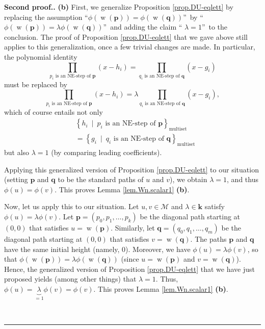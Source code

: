 \documentclass[numbers=enddot,12pt,final,onecolumn,notitlepage]{scrartcl}%
\theoremstyle{definition}
\newenvironment{proof}[1][Proof]{\noindent\textbf{#1.} }{\ \rule{0.5em}{0.5em}}
\newcommand{\M}{\mathcal{M}}
\newcommand{\kk}{\mathbf{k}}
\newcommand{\pp}{\mathbf{p}}
\newcommand{\qq}{\mathbf{q}}
\newcommand{\w}{\operatorname{w}}
\newcommand{\multiset}{\operatorname{multiset}}
\newcommand{\tup}[1]{\left( #1 \right)}
\newenvironment{verlong}{}{}
\newenvironment{vershort}{}{}
\begin{document}
\begin{proof}[Second proof.]
\textbf{(b)} First, we generalize Proposition
\ref{prop.DU-eqlett} by replacing the assumption \textquotedblleft$\phi\left(
\w\left(  \pp\right)  \right)  =\phi\left(
\w\left(  \qq\right)  \right)  $\textquotedblright\ by
\textquotedblleft$\phi\left(  \w\left(  \pp\right)
\right)  =\lambda\phi\left(  \w\left(  \qq\right)
\right)  $\textquotedblright\ and adding the claim \textquotedblleft%
$\lambda=1$\textquotedblright\ to the conclusion. The proof of Proposition
\ref{prop.DU-eqlett} that we gave above still applies to this generalization,
once a few trivial changes are made. In particular, the polynomial identity%
\[
\prod_{p_{i}\text{ is an NE-step of }\pp}\left(  x-h_{i}\right)
=\prod_{q_{i}\text{ is an NE-step of }\qq}\left(  x-g_{i}\right)
\]
must be replaced by%
\[
\prod_{p_{i}\text{ is an NE-step of }\pp}\left(  x-h_{i}\right)
=\lambda\prod_{q_{i}\text{ is an NE-step of }\qq}\left(  x-g_{i}%
\right)  ,
\]
which of course entails not only%
\begin{align*}
&  \left\{  h_{i}\ \mid\ p_{i}\text{ is an NE-step of }\pp\right\}
_{\multiset}\\
&  =\left\{  g_{i}\ \mid\ q_{i}\text{ is an NE-step of }\qq\right\}
_{\multiset}%
\end{align*}
but also $\lambda=1$ (by comparing leading coefficients).

\begin{vershort}
Applying this generalized version of Proposition
\ref{prop.DU-eqlett}
to our situation (setting $\pp$ and $\qq$ to be the
standard paths of $u$ and $v$), we obtain $\lambda = 1$,
and thus $\phi\tup{u} = \phi\tup{v}$.
This proves Lemma \ref{lem.Wn.scalar1} \textbf{(b)}.
\end{vershort}

\begin{verlong}
Now, let us apply this to our situation. Let $u,v\in\M$ and
$\lambda\in\kk$ satisfy $\phi\left(  u\right)  =\lambda\phi\left(
v\right)  $. Let $\pp=\left(  p_{0},p_{1},\ldots,p_{k}\right)  $ be the
diagonal path starting at $\left(  0,0\right)  $ that satisfies
$u=\w\left(  \pp\right)  $. Similarly, let
$\qq=\left(  q_{0},q_{1},\ldots,q_{m}\right)  $ be the diagonal path
starting at $\left(  0,0\right)  $ that satisfies $v=\w\left(
\qq\right)  $. The paths $\pp$ and $\qq$ have the same
initial height (namely, $0$). Moreover, we have $\phi\left(  u\right)
=\lambda\phi\left(  v\right)  $, so that $\phi\left(  \w\left(
\pp\right)  \right)  =\lambda\phi\left(  \w\left(
\qq\right)  \right)  $ (since $u=\w\left(
\pp\right)  $ and $v=\w\left(  \qq\right)  $).
Hence, the generalized version of Proposition \ref{prop.DU-eqlett} that we
have just proposed yields (among other things) that $\lambda=1$. Thus,
$\phi\left(  u\right)  =\underbrace{\lambda}_{=1}\phi\left(  v\right)
=\phi\left(  v\right)  $.
This proves Lemma \ref{lem.Wn.scalar1} \textbf{(b)}.
\end{verlong}
\medskip


\end{proof}
\end{document}
